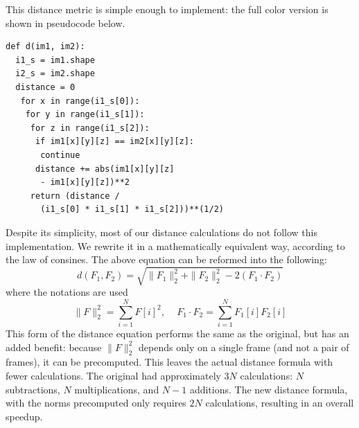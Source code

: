 This distance metric is simple enough to implement: the full color version is shown in pseudocode below.
\begin{verbatim}
def d(im1, im2):
  i1_s = im1.shape
  i2_s = im2.shape
  distance = 0
   for x in range(i1_s[0]):
    for y in range(i1_s[1]):
     for z in range(i1_s[2]):
      if im1[x][y][z] == im2[x][y][z]:
       continue
      distance += abs(im1[x][y][z] 
       - im1[x][y][z])**2
     return (distance /
       (i1_s[0] * i1_s[1] * i1_s[2]))**(1/2)
\end{verbatim}
Despite its simplicity, most of our distance calculations do not follow this implementation. We rewrite it in a mathematically equivalent way, according to the law of consines. The above equation can be reformed into the following:
																																														$$d(F_1,  F_2) = \sqrt{ \|F_1\|_2^2 + \| F_2\|_2^2 - 2 (F_1 \cdot  F_2) }$$
																																														where the notations are used
																																														$$\|F\|_2^2 = \sum_{i=1}^N F[i]^2,  \,\,\,\,\,\,\, F_1 \cdot F_2 =  \sum_{i=1}^N F_1[i]F_2[i]$$
																																														This form of the distance equation performs the same as the original, but has an added benefit: because $\|F\|_2^2$ depends only on a single frame (and not a pair of frames), it can be precomputed. This leaves the actual distance formula with fewer calculations. The original had approximately $3N$ calculations: $N$ subtractions, $N$ multiplications, and $N-1$ additions. The new distance formula, with the norms precomputed only requires $2N$ calculations, resulting in an overall speedup. 

